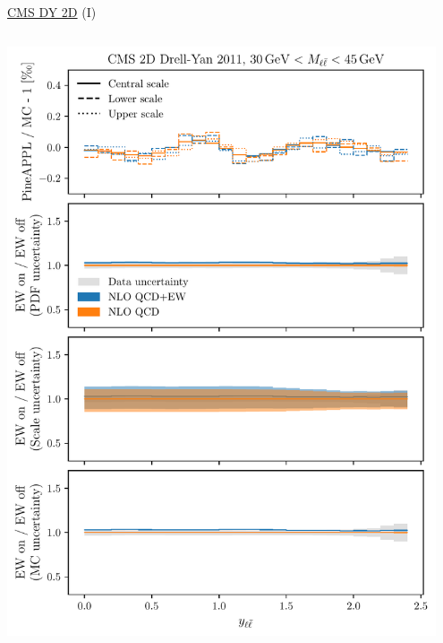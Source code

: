\begin{frame}{\href{https://arxiv.org/abs/1412.1115}{CMS DY 2D} (I)}
\begin{columns}
\begin{column}{0.5\textwidth}
\includegraphics[width=0.95\textwidth]{ew_corrections/figures/pineappl_CMSDY2D11_bin2}
\end{column}
\end{columns}
\end{frame}

